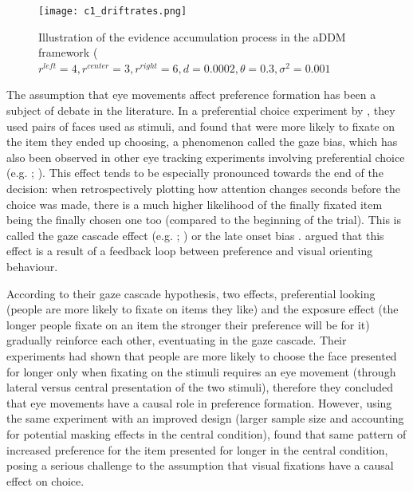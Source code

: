 \documentclass[11pt,a4paper]{article}
\begin{document}

\begin{figure}
\centering
\caption{Illustration of the evidence accumulation process in the aDDM framework
($\mathit{\mathit{r^{left}=4,r^{center}=3,r^{right}=6,d=0.0002,}\theta=0.3,\sigma^{2}=0.001}$}
\texttt{[image: c1\_driftrates.png]}
\label{fig:driftrates}
\end{figure}

The assumption that eye movements affect preference formation has been a subject of debate in the literature. In a preferential choice experiment by , they used pairs of faces used as stimuli, and found that were more likely to fixate on the item they ended up choosing, a phenomenon called the gaze bias, which has also been observed in other eye tracking experiments involving preferential choice (e.g. ; ). This effect tends to be especially pronounced towards the end of the decision: when retrospectively plotting how attention changes seconds before the choice was made, there is a much higher likelihood of the finally fixated item being the finally chosen one too (compared to the beginning of the trial). This is called the gaze cascade effect (e.g. ; ) or the late onset bias .  argued that this effect is a result of a feedback loop between preference and visual orienting behaviour. 

According to their gaze cascade hypothesis, two effects, preferential looking (people are more likely to fixate on items they like) and the exposure effect (the longer people fixate on an item the stronger their preference will be for it) gradually reinforce each other, eventuating in the gaze cascade. Their experiments had shown that people are more likely to choose the face presented for longer only when fixating on the stimuli requires an eye movement (through lateral versus central presentation of the two stimuli), therefore they concluded that eye movements have a causal role in preference formation. However, using the same experiment with an improved design (larger sample size and accounting for potential masking effects in the central condition),  found that same pattern of increased preference for the item presented for longer in the central condition, posing a serious challenge to the assumption that visual fixations have a causal effect on choice.
\end{document}
